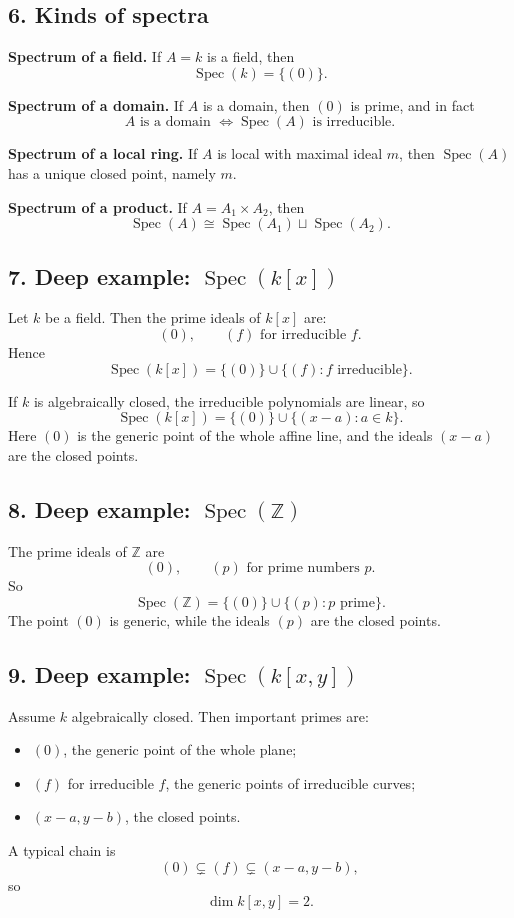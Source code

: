 \documentclass[12pt,a4paper]{article}
\theoremstyle{plain}
\theoremstyle{definition}      %
\begin{document}
\subsection*{6. Kinds of spectra}

\textbf{Spectrum of a field.}
If \(A=k\) is a field, then
\[
\operatorname{Spec}(k)=\{(0)\}.
\]

\textbf{Spectrum of a domain.}
If \(A\) is a domain, then \((0)\) is prime, and in fact
\[
A \text{ is a domain } \iff \operatorname{Spec}(A) \text{ is irreducible}.
\]

\textbf{Spectrum of a local ring.}
If \(A\) is local with maximal ideal \(m\), then \(\operatorname{Spec}(A)\) has a unique closed point, namely \(m\).

\textbf{Spectrum of a product.}
If \(A=A_1\times A_2\), then
\[
\operatorname{Spec}(A)\cong \operatorname{Spec}(A_1)\sqcup \operatorname{Spec}(A_2).
\]

\subsection*{7. Deep example: \(\operatorname{Spec}(k[x])\)}

Let \(k\) be a field. Then the prime ideals of \(k[x]\) are:
\[
(0), \qquad (f)\text{ for irreducible }f.
\]
Hence
\[
\operatorname{Spec}(k[x])
=
\{(0)\}\cup\{(f): f\text{ irreducible}\}.
\]

If \(k\) is algebraically closed, the irreducible polynomials are linear, so
\[
\operatorname{Spec}(k[x])
=
\{(0)\}\cup\{(x-a):a\in k\}.
\]
Here \((0)\) is the generic point of the whole affine line, and the ideals \((x-a)\) are the closed points.

\subsection*{8. Deep example: \(\operatorname{Spec}(\mathbb Z)\)}

The prime ideals of \(\mathbb Z\) are
\[
(0),\qquad (p)\text{ for prime numbers }p.
\]
So
\[
\operatorname{Spec}(\mathbb Z)=\{(0)\}\cup\{(p):p\text{ prime}\}.
\]
The point \((0)\) is generic, while the ideals \((p)\) are the closed points.

\subsection*{9. Deep example: \(\operatorname{Spec}(k[x,y])\)}

Assume \(k\) algebraically closed. Then important primes are:
\begin{itemize}
	\item \((0)\), the generic point of the whole plane;
	\item \((f)\) for irreducible \(f\), the generic points of irreducible curves;
	\item \((x-a,y-b)\), the closed points.
\end{itemize}
A typical chain is
\[
(0)\subsetneq (f)\subsetneq (x-a,y-b),
\]
so
\[
\dim k[x,y]=2.
\]
\end{document}
